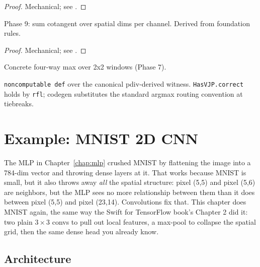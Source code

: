 \begin{proof}
\leanok
Mechanical; see .
\end{proof}

\begin{theorem}
  \label{ax:conv2d_bias_grad_has_vjp}
  \leanok
  Phase 9: sum cotangent over spatial dims per channel.
  Derived from foundation rules.
\end{theorem}

\begin{proof}
\leanok
Mechanical; see .
\end{proof}

\begin{definition}
  \label{ax:maxPool2}
  \leanok
  Concrete four-way max over 2x2 windows (Phase 7).
\end{definition}

\begin{definition}
  \label{ax:maxPool2_has_vjp3}
  \leanok
  \texttt{noncomputable def} over the canonical pdiv-derived
  witness. \texttt{HasVJP.correct} holds by \texttt{rfl}; codegen
  substitutes the standard argmax routing convention at tiebreaks.
\end{definition}

\section{Example: MNIST 2D CNN}
\label{sec:cnn_mnist_example}

The MLP in Chapter~\ref{chap:mlp} crushed MNIST by flattening the
image into a 784-dim vector and throwing dense layers at it. That
works because MNIST is small, but it also throws away \emph{all}
the spatial structure: pixel (5,5) and pixel (5,6) are neighbors,
but the MLP sees no more relationship between them than it does
between pixel (5,5) and pixel (23,14). Convolutions fix that. This
chapter does MNIST again, the same way the Swift for TensorFlow
book's Chapter 2 did it: two plain $3 \times 3$ convs to pull out
local features, a max-pool to collapse the spatial grid, then the
same dense head you already know.

\subsection*{Architecture}

